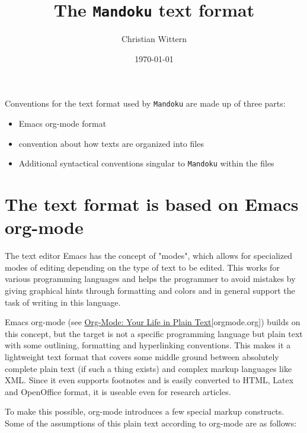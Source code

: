 \documentclass[11pt]{article}
\author{Christian Wittern}
\date{\today}
\title{The \texttt{Mandoku} text format}
\begin{document}
\maketitle
Conventions for the text format used by \texttt{Mandoku} are made up of three parts:
\begin{itemize}
\item Emacs org-mode format
\item convention about how texts are organized into files
\item Additional syntactical conventions singular to \texttt{Mandoku} within the files
\end{itemize}

\section{The text format is based on Emacs org-mode}
\label{sec-1}

The text editor Emacs has the concept of "modes", which allows for
specialized modes of editing depending on the type of text to be
edited. This works for various programming languages and helps the
programmer to avoid mistakes by giving graphical hints through
formatting and colors and in general support the task of writing in
this language.  

Emacs org-mode (see \href{http://orgmode.org/}{Org-Mode: Your Life in Plain Text}[orgmode.org]) builds on
this concept, but the target is not a specific programming language
but plain text with some outlining, formatting and hyperlinking
conventions.  This makes it a lightweight text format that covers
some middle ground between absolutely complete plain text (if such a
thing exists) and complex markup languages like XML.  Since it even
supports footnotes and is easily converted to HTML, Latex and
OpenOffice format, it is useable even for research articles.

To make this possible, org-mode introduces a few special markup
constructs. Some of the assumptions of this plain text according to
org-mode are as follows:
\end{document}
